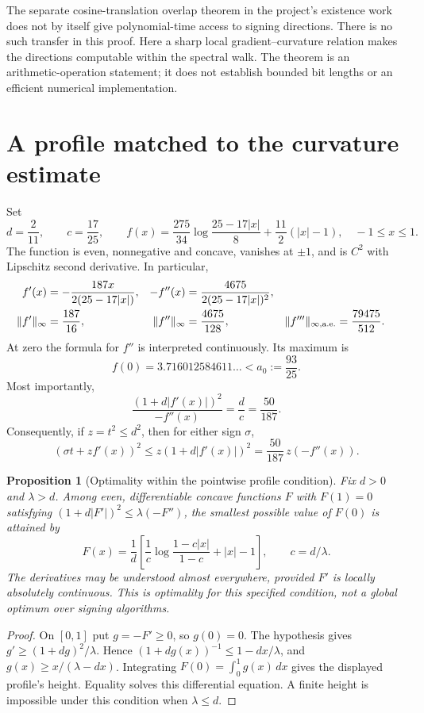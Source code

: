 \documentclass[11pt]{amsart}
\newtheorem{proposition}[theorem]{Proposition}
\theoremstyle{remark}\newtheorem{remark}[theorem]{Remark}
\begin{document}
The separate cosine-translation overlap theorem in the project's existence
work does not by itself give polynomial-time access to signing directions.
There is no such transfer in this proof. Here a sharp local
gradient--curvature relation makes the directions computable within the
spectral walk. The theorem is an arithmetic-operation statement; it does
not establish bounded bit lengths or an efficient numerical implementation.

\section{A profile matched to the curvature estimate}\label{sec:profile}

Set
\[
 d=\frac2{11},\qquad c=\frac{17}{25},\qquad
 f(x)=\frac{275}{34}\log\frac{25-17|x|}{8}
                 +\frac{11}{2}(|x|-1),\quad -1\le x\le1.
\]
The function is even, nonnegative and concave, vanishes at $\pm1$, and is
$C^2$ with Lipschitz second derivative. In particular,
\begin{align}\label{eq:fderivatives}
 f'(x)&=-\frac{187x}{2(25-17|x|)},&
 -f''(x)&=\frac{4675}{2(25-17|x|)^2},\notag\\
 \|f'\|_\infty&=\frac{187}{16},&
 \|f''\|_\infty&=\frac{4675}{128},&
 \|f'''\|_{\infty,\mathrm{a.e.}}&=\frac{79475}{512}.
\end{align}
At zero the formula for $f''$ is interpreted continuously. Its maximum is
\[
 f(0)=3.716012584611\ldots<a_0:=\frac{93}{25}.
\]
Most importantly,
\begin{equation}\label{eq:exactratio}
 \frac{(1+d|f'(x)|)^2}{-f''(x)}=\frac dc=\frac{50}{187}.
\end{equation}
Consequently, if $z=t^2\le d^2$, then for either sign $\sigma$,
\begin{equation}\label{eq:pointwise}
 (\sigma t+z f'(x))^2
 \le z(1+d|f'(x)|)^2
 =\frac{50}{187}\,z(-f''(x)).
\end{equation}

\begin{proposition}[Optimality within the pointwise profile condition]
Fix $d>0$ and $\lambda>d$. Among even, differentiable concave functions
$F$ with $F(1)=0$ satisfying
$(1+d|F'|)^2\le\lambda(-F'')$, the smallest possible value of $F(0)$ is
attained by
\[
 F(x)=\frac1d\left[\frac1c\log\frac{1-c|x|}{1-c}+|x|-1\right],
 \qquad c=d/\lambda.
\]
The derivatives may be understood almost everywhere, provided $F'$ is
locally absolutely continuous. This is optimality for this specified
condition, not a global optimum over signing algorithms.
\end{proposition}
\begin{proof}
On $[0,1]$ put $g=-F'\ge0$, so $g(0)=0$. The hypothesis gives
$g'\ge(1+dg)^2/\lambda$. Hence
$(1+dg(x))^{-1}\le1-dx/\lambda$, and
$g(x)\ge x/(\lambda-dx)$.
Integrating $F(0)=\int_0^1g(x)\,dx$ gives the displayed profile's height.
Equality solves this differential equation. A finite height is impossible
under this condition when $\lambda\le d$.
\end{proof}
\end{document}

